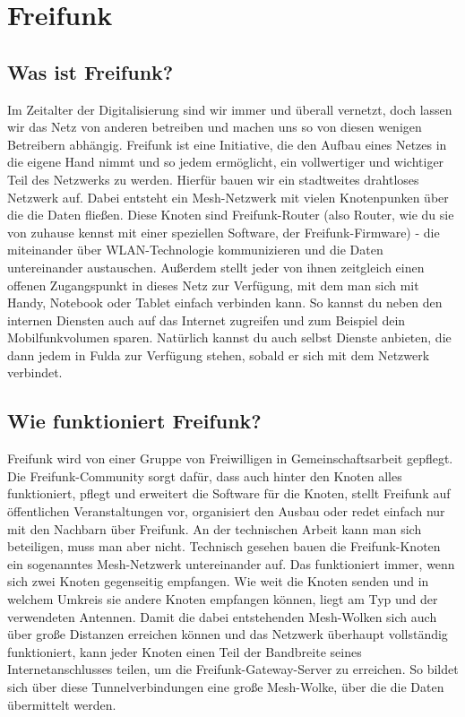 \section{Freifunk}
\subsection{Was ist Freifunk?}
Im Zeitalter der Digitalisierung sind wir immer und überall vernetzt, doch lassen wir das Netz von anderen betreiben und machen uns so von diesen wenigen Betreibern abhängig. Freifunk ist eine Initiative, die den Aufbau eines Netzes in die eigene Hand nimmt und so jedem ermöglicht, ein vollwertiger und wichtiger Teil des Netzwerks zu werden. Hierfür bauen wir ein stadtweites drahtloses Netzwerk auf. Dabei entsteht ein Mesh-Netzwerk mit vielen Knotenpunken über die die Daten fließen. Diese Knoten sind Freifunk-Router (also Router, wie du sie von zuhause kennst mit einer speziellen Software, der Freifunk-Firmware) - die miteinander über WLAN-Technologie kommunizieren und die Daten untereinander austauschen. Außerdem stellt jeder von ihnen zeitgleich einen offenen Zugangspunkt in dieses Netz zur Verfügung, mit dem man sich mit Handy, Notebook oder Tablet einfach verbinden kann. So kannst du neben den internen Diensten auch auf das Internet zugreifen und zum Beispiel dein Mobilfunkvolumen sparen. Natürlich kannst du auch selbst Dienste anbieten, die dann jedem in Fulda zur Verfügung stehen, sobald er sich mit dem Netzwerk verbindet.

\subsection{Wie funktioniert Freifunk?}
Freifunk wird von einer Gruppe von Freiwilligen in Gemeinschaftsarbeit gepflegt. Die Freifunk-Community sorgt dafür, dass auch hinter den Knoten alles funktioniert, pflegt und erweitert die Software für die Knoten, stellt Freifunk auf öffentlichen Veranstaltungen vor, organisiert den Ausbau oder redet einfach nur mit den Nachbarn über Freifunk. An der technischen Arbeit kann man sich beteiligen, muss man aber nicht.
Technisch gesehen bauen die Freifunk-Knoten ein sogenanntes Mesh-Netzwerk untereinander auf. Das funktioniert immer, wenn sich zwei Knoten gegenseitig empfangen. Wie weit die Knoten senden und in welchem Umkreis sie andere Knoten empfangen können, liegt am Typ und der verwendeten Antennen. Damit die dabei entstehenden Mesh-Wolken sich auch über große Distanzen erreichen können und das Netzwerk überhaupt vollständig funktioniert, kann jeder Knoten einen Teil der Bandbreite seines Internetanschlusses teilen, um die Freifunk-Gateway-Server zu erreichen. So bildet sich über diese Tunnelverbindungen eine große Mesh-Wolke, über die die Daten übermittelt werden.


